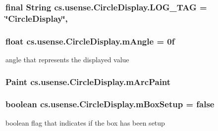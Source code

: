\subsubsection[{L\+O\+G\+\_\+\+T\+A\+G}]{\setlength{\rightskip}{0pt plus 5cm}final String cs.\+usense.\+Circle\+Display.\+L\+O\+G\+\_\+\+T\+A\+G = \char`\"{}Circle\+Display\char`\"{}\hspace{0.3cm}{\ttfamily [static]}, {\ttfamily [private]}}\label{classcs_1_1usense_1_1_circle_display_a7ed7b9fe57335bc6748560bd46cd40a9}
\hypertarget{classcs_1_1usense_1_1_circle_display_a5f3c0c5c31e3f607b7ba95d7d1d0e36d}{}
\subsubsection[{m\+Angle}]{\setlength{\rightskip}{0pt plus 5cm}float cs.\+usense.\+Circle\+Display.\+m\+Angle = 0f\hspace{0.3cm}{\ttfamily [private]}}\label{classcs_1_1usense_1_1_circle_display_a5f3c0c5c31e3f607b7ba95d7d1d0e36d}
angle that represents the displayed value \hypertarget{classcs_1_1usense_1_1_circle_display_a052f51c1e072e1e3c6d5e9ca7347f11a}{}
\subsubsection[{m\+Arc\+Paint}]{\setlength{\rightskip}{0pt plus 5cm}Paint cs.\+usense.\+Circle\+Display.\+m\+Arc\+Paint\hspace{0.3cm}{\ttfamily [private]}}\label{classcs_1_1usense_1_1_circle_display_a052f51c1e072e1e3c6d5e9ca7347f11a}
\hypertarget{classcs_1_1usense_1_1_circle_display_a6ff55c9c52c8d854e728100a47f576ef}{}
\subsubsection[{m\+Box\+Setup}]{\setlength{\rightskip}{0pt plus 5cm}boolean cs.\+usense.\+Circle\+Display.\+m\+Box\+Setup = false\hspace{0.3cm}{\ttfamily [private]}}\label{classcs_1_1usense_1_1_circle_display_a6ff55c9c52c8d854e728100a47f576ef}
boolean flag that indicates if the box has been setup \hypertarget{classcs_1_1usense_1_1_circle_display_ae25a9c68b75ab460d8fc52214a9cb7fd}{}

